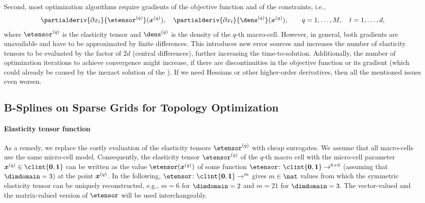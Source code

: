 Second, most optimization algorithms require gradients of the
objective function and of the constraints, i.e.,%
\begin{equation}
  \partialderiv{\partialdiff{} x_t}{\etensor^{(q)}}(\*x^{(q)}),\quad
  \partialderiv{\partialdiff{} x_t}{\dens^{(q)}}(\*x^{(q)}),\qquad
  q = 1, \dotsc, M,\quad
  t = 1, \dotsc, d,
\end{equation}
where $\etensor^{(q)}$ is the elasticity tensor and
$\dens^{(q)}$ is the density of the $q$-th macro-cell.
However, in general, both gradients are unavailable and
have to be approximated by finite differences.
This introduces new error sources and
increases the number of elasticity tensors to be evaluated
by the factor of $2d$ (central differences),
further increasing the time-to-solution.
Additionally, the number of optimization iterations to
achieve convergence might increase,
if there are discontinuities in the objective function
or its gradient
(which could already be caused by the inexact solution of the \fem).
If we need Hessians or other higher-order derivatives,
then all the mentioned issues even worsen.



\subsection{B-Splines on Sparse Grids for Topology Optimization}
\label{sec:622BSplines}

\paragraph{Elasticity tensor function}

As a remedy, we replace the costly evaluation of the
elasticity tensors $\etensor^{(q)}$ with cheap surrogates.
We assume that all macro-cells use the same micro-cell model.
Consequently, the elasticity tensor $\etensor^{(q)}$ of the $q$-th macro cell
with the micro-cell parameter $\*x^{(q)} \in \clint{\*0, \*1}$
can be written as the value $\etensor(\*x^{(q)})$ of some function
$\etensor\colon \clint{\*0, \*1} \to \real^{6 \times 6}$
(assuming that $\dimdomain = 3$) at the point ${\boldsymbol{x}}^{(q)}$.
In the following,
$\etensor\colon \clint{\*0, \*1} \to \real^m$
gives $m \in \nat$ values from which the symmetric elasticity tensor
can be uniquely reconstructed,
e.g., $m = 6$ for $\dimdomain = 2$ and $m = 21$ for $\dimdomain = 3$.
The vector-valued and the matrix-valued version of $\etensor$
will be used interchangeably.

